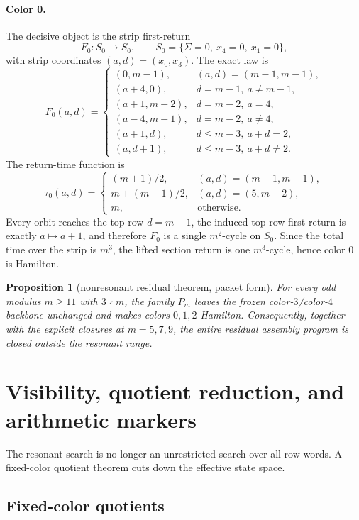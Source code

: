 \documentclass[11pt]{article}
\newtheorem{proposition}[theorem]{Proposition}
\newcommand{\Pm}{P_m}
\begin{document}
\paragraph{Color 0.}
The decisive object is the strip first-return
\[
F_0:S_0\to S_0,
\qquad
S_0=\{\Sigma=0,\ x_4=0,\ x_1=0\},
\]
with strip coordinates $(a,d)=(x_0,x_3)$.
The exact law is
\[
F_0(a,d)=
\begin{cases}
(0,m-1), & (a,d)=(m-1,m-1),\\
(a+4,0), & d=m-1,\ a\neq m-1,\\
(a+1,m-2), & d=m-2,\ a=4,\\
(a-4,m-1), & d=m-2,\ a\neq 4,\\
(a+1,d), & d\le m-3,\ a+d=2,\\
(a,d+1), & d\le m-3,\ a+d\neq 2.
\end{cases}
\]
The return-time function is
\[
\tau_0(a,d)=
\begin{cases}
(m+1)/2,& (a,d)=(m-1,m-1),\\
m+(m-1)/2,& (a,d)=(5,m-2),\\
m,& \text{otherwise.}
\end{cases}
\]
Every orbit reaches the top row $d=m-1$, the induced top-row first-return is
exactly $a\mapsto a+1$, and therefore $F_0$ is a single $m^2$-cycle on $S_0$.
Since the total time over the strip is $m^3$, the lifted section return is one
$m^3$-cycle, hence color $0$ is Hamilton.

\begin{proposition}[nonresonant residual theorem, packet form]
For every odd modulus $m\ge 11$ with $3\nmid m$, the family $\Pm$ leaves the
frozen color-$3$/color-$4$ backbone unchanged and makes colors $0,1,2$
Hamilton.
Consequently, together with the explicit closures at $m=5,7,9$, the entire
residual assembly program is closed outside the resonant range.
\end{proposition}

\section{Visibility, quotient reduction, and arithmetic markers}

The resonant search is no longer an unrestricted search over all row words.
A fixed-color quotient theorem cuts down the effective state space.

\subsection{Fixed-color quotients}
\end{document}
